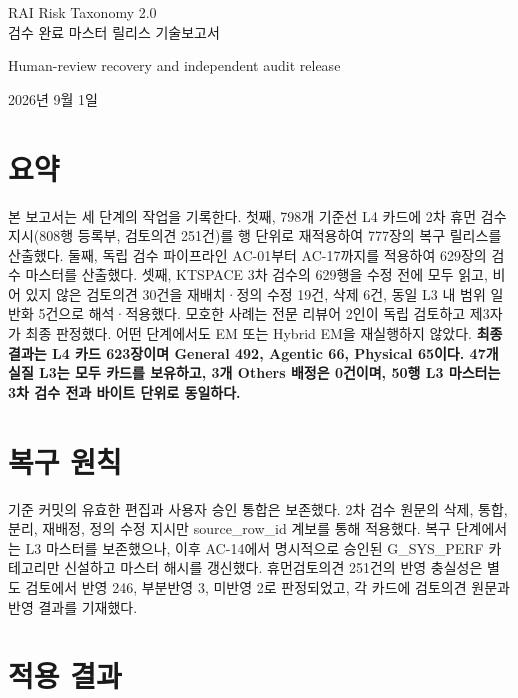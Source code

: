 \documentclass[11pt,a4paper]{article}
\begin{document}
\begin{titlepage}
\thispagestyle{empty}
\vspace*{42mm}
\begin{center}
{\LARGE RAI Risk Taxonomy 2.0\\[3pt]검수 완료 마스터 릴리스 기술보고서}\par
\vspace{9mm}
{\large Human-review recovery and independent audit release}\par
\vspace{6mm}
{\large 2026년 9월 1일}\par
\vspace{9mm}
\end{center}
\end{titlepage}
\par\section*{요약}
본 보고서는 세 단계의 작업을 기록한다. 첫째, 798개 기준선 L4 카드에 2차 휴먼 검수 지시(808행 등록부, 검토의견 251건)를 행 단위로 재적용하여 777장의 복구 릴리스를 산출했다. 둘째, 독립 검수 파이프라인 AC-01부터 AC-17까지를 적용하여 629장의 검수 마스터를 산출했다. 셋째, KTSPACE 3차 검수의 629행을 수정 전에 모두 읽고, 비어 있지 않은 검토의견 30건을 재배치·정의 수정 19건, 삭제 6건, 동일 L3 내 범위 일반화 5건으로 해석·적용했다. 모호한 사례는 전문 리뷰어 2인이 독립 검토하고 제3자가 최종 판정했다. 어떤 단계에서도 EM 또는 Hybrid EM을 재실행하지 않았다. \textbf{최종 결과는 L4 카드 623장이며 General 492, Agentic 66, Physical 65이다. 47개 실질 L3는 모두 카드를 보유하고, 3개 Others 배정은 0건이며, 50행 L3 마스터는 3차 검수 전과 바이트 단위로 동일하다.}
\par\section{복구 원칙}
기준 커밋의 유효한 편집과 사용자 승인 통합은 보존했다. 2차 검수 원문의 삭제, 통합, 분리, 재배정, 정의 수정 지시만 source\_row\_id 계보를 통해 적용했다. 복구 단계에서는 L3 마스터를 보존했으나, 이후 AC-14에서 명시적으로 승인된 G\_SYS\_PERF 카테고리만 신설하고 마스터 해시를 갱신했다. 휴먼검토의견 251건의 반영 충실성은 별도 검토에서 반영 246, 부분반영 3, 미반영 2로 판정되었고, 각 카드에 검토의견 원문과 반영 결과를 기재했다.
\par\section{적용 결과}
\end{document}
